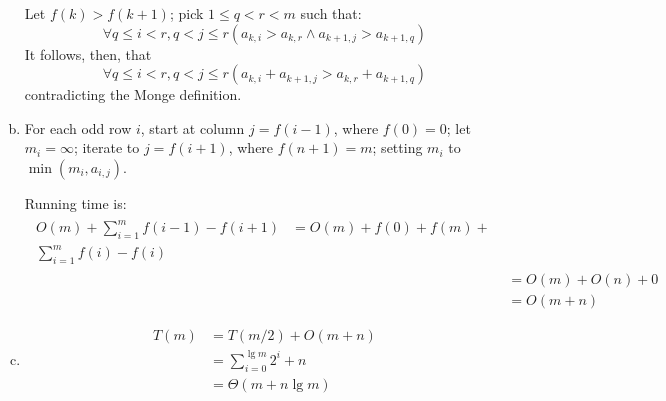 \documentclass{article}
\begin{document}
\begin{enumerate}[a.]
      Let $f(k) > f(k+1)$; pick $1 \leq q < r < m$ such that:
      \[\forall q \leq i < r, q < j \leq r (a_{k,i} > a_{k,r} \wedge a_{k+1,j} > a_{k+1, q})\]
      It follows, then, that
      \[\forall q \leq i < r, q < j \leq r (a_{k,i} + a_{k+1,j} > a_{k,r} + a_{k+1,q})\]
      contradicting the Monge definition.
    \item For each odd row $i$, start at column $j = f(i-1)$, where $f(0)
      = 0$; let $m_i = \infty$; iterate to $j = f(i+1)$, where $f(n+1)=m$;
      setting $m_i$ to $\min(m_i, a_{i,j})$.

      Running time is:
      \begin{align}
        \begin{split}
          O(m) + \sum_{i=1}^mf(i - 1)- f(i+1) &= O(m) + f(0) + f(m) + \\
          \sum_{i=1}^mf(i)-f(i)
        \end{split}\\
        &= O(m) + O(n) + 0\\
        &= O(m + n)
      \end{align}
    \item
      \begin{align}
        T(m) &= T(m/2) + O(m + n)\\
        &= \sum_{i=0}^{\lg m}2^i+n\\
        &= \Theta(m + n\lg m)
      \end{align}
\end{enumerate}
\end{document}
